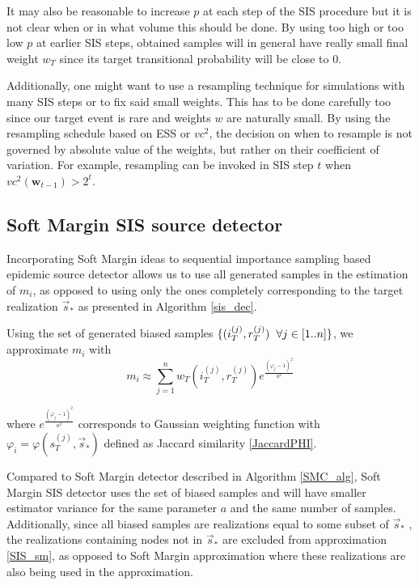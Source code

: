 \documentclass[times, utf8, diplomski]{fer}
\begin{document}
It may also be reasonable to increase $p$ at each step of the SIS procedure but it is not clear when or in what volume this should be done. By using too high or too low $p$ at earlier SIS steps, obtained samples will in general have really small final weight $w_T$ since its target transitional probability will be close to $0$.

Additionally, one might want to use a resampling technique for simulations with many  SIS steps or to fix said small weights. This has to be done carefully too since our target event is rare and weights $w$ are naturally small. By using the resampling schedule based on  ESS or $vc^2$, the decision on when to resample is not governed by absolute value of the weights, but rather on their coefficient of variation. For example, resampling can be invoked in SIS step $t$ when  $vc^2(\mathbf{w}_{t - 1}) > 2^t$.

\subsection{Soft Margin SIS source detector}
Incorporating Soft Margin ideas to sequential importance sampling based epidemic source detector allows us to use all generated samples in the estimation of $m_i$, as opposed to using only the ones completely corresponding to the target realization $\vec s_*$ as presented in Algorithm \ref{sis_dec}.

Using the set of generated biased samples $\{(i_{T}^{(j)}, r_{T}^{(j)}) \hspace{2mm}\forall j \in [1..n]\}$, we approximate $m_i$ with  
\begin{equation}
m_i \approx \sum_{j = 1}^{n} w_T(i_{T}^{(j)}, r_{T}^{(j)})  e^{\frac{(\varphi_j - 1)^2}{a^2}}
\label{SIS_sm}
\end{equation}
 
where $e^{\frac{(\varphi_j - 1)^2}{a^2}}$ corresponds to Gaussian weighting function  with $\varphi_i = \varphi(s_T^{(j)}, \vec s_*)$ defined as Jaccard similarity \ref{JaccardPHI}.

Compared to Soft Margin detector described in Algorithm \ref{SMC_alg}, Soft Margin SIS detector uses the set of biased samples and  will have  smaller estimator variance for the same parameter $a$ and the same number of samples. Additionally, since all biased samples are realizations equal to some subset  of $\vec s_*$ , the realizations containing nodes not in $\vec s_*$ are excluded from approximation \ref{SIS_sm}, as opposed to Soft Margin approximation where these realizations are also being used in the approximation.
\end{document}
